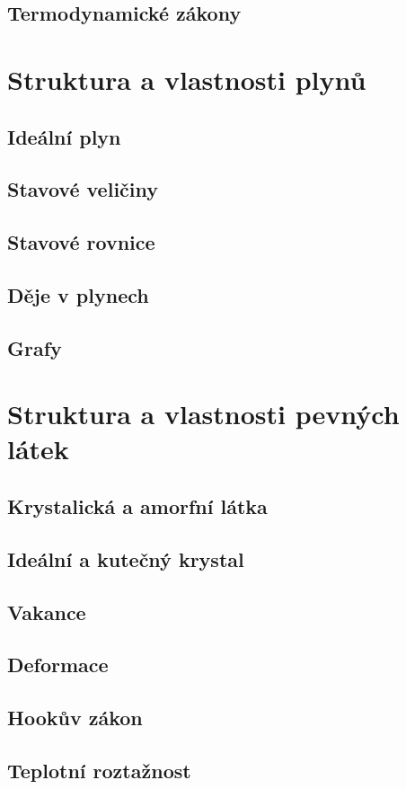 \documentclass[titlepage]{book}
\begin{document}
\section{Termodynamické zákony}
\chapter{Struktura a vlastnosti plynů}
\section{Ideální plyn}
\section{Stavové veličiny}
\section{Stavové rovnice}
\section{Děje v plynech}
\section{Grafy}
\chapter{Struktura a vlastnosti pevných látek}
\section{Krystalická a amorfní látka}
\section{Ideální a kutečný krystal}
\section{Vakance}
\section{Deformace}
\section{Hookův zákon}
\section{Teplotní roztažnost}
\end{document}
